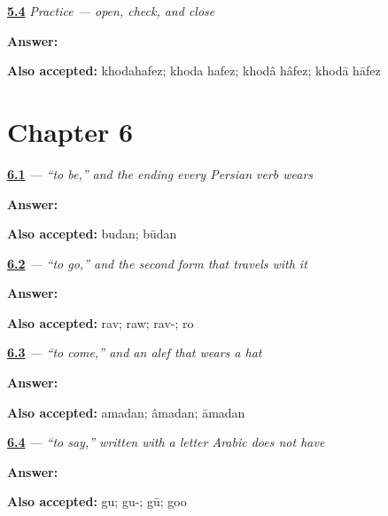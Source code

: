 \noindent\begin{minipage}[t]{\linewidth}
\raggedright
\hyperlink{review-FA-C05-practice-final-line}{\textbf{5.4}} \emph{Practice — open, check, and close}\par
\small \textbf{Answer:} \par
\footnotesize \textbf{Also accepted:} khodahafez; khoda hafez; khodâ hâfez; khodā hāfez
\end{minipage}\par\medskip

\section*{Chapter 6}

\noindent\begin{minipage}[t]{\linewidth}
\raggedright
\hyperlink{review-FA-C06-budan-infinitive}{\textbf{6.1}} \emph{ — “to be,” and the ending every Persian verb wears}\par
\small \textbf{Answer:} \par
\footnotesize \textbf{Also accepted:} budan; būdan
\end{minipage}\par\medskip

\noindent\begin{minipage}[t]{\linewidth}
\raggedright
\hyperlink{review-FA-C06-raftan-stem}{\textbf{6.2}} \emph{ — “to go,” and the second form that travels with it}\par
\small \textbf{Answer:} \par
\footnotesize \textbf{Also accepted:} rav; raw; rav-; ro
\end{minipage}\par\medskip

\noindent\begin{minipage}[t]{\linewidth}
\raggedright
\hyperlink{review-FA-C06-amadan-verb}{\textbf{6.3}} \emph{ — “to come,” and an alef that wears a hat}\par
\small \textbf{Answer:} \par
\footnotesize \textbf{Also accepted:} amadan; âmadan; āmadan
\end{minipage}\par\medskip

\noindent\begin{minipage}[t]{\linewidth}
\raggedright
\hyperlink{review-FA-C06-goftan-stem}{\textbf{6.4}} \emph{ — “to say,” written with a letter Arabic does not have}\par
\small \textbf{Answer:} \par
\footnotesize \textbf{Also accepted:} gu; gu-; gū; goo
\end{minipage}\par\medskip

